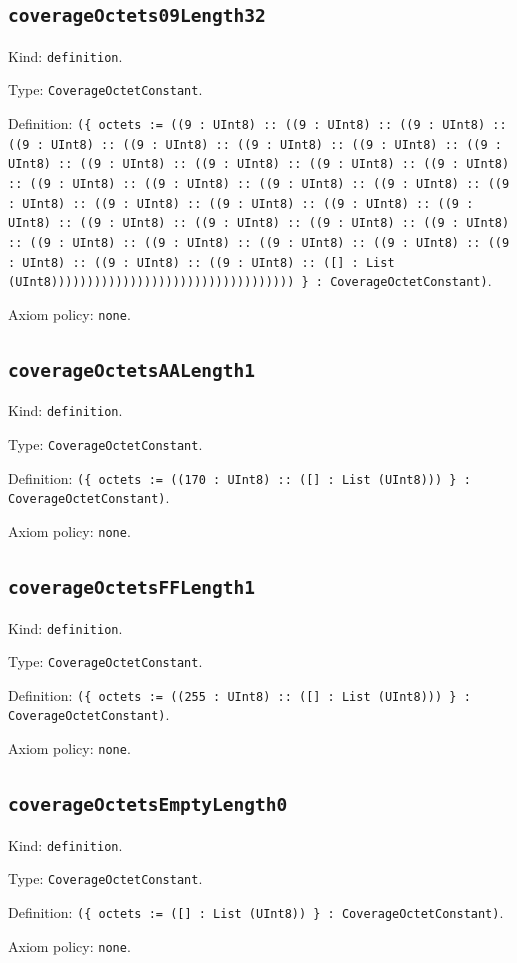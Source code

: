 \documentclass[11pt]{article}
\begin{document}
\subsection*{\texttt{coverageOctets09Length32}}
\noindent Kind: \texttt{definition}.\par
\noindent Type: \texttt{CoverageOctetConstant}.\par
\noindent Definition: \texttt{(\{ octets := ((9 : UInt8) :: ((9 : UInt8) :: ((9 : UInt8) :: ((9 : UInt8) :: ((9 : UInt8) :: ((9 : UInt8) :: ((9 : UInt8) :: ((9 : UInt8) :: ((9 : UInt8) :: ((9 : UInt8) :: ((9 : UInt8) :: ((9 : UInt8) :: ((9 : UInt8) :: ((9 : UInt8) :: ((9 : UInt8) :: ((9 : UInt8) :: ((9 : UInt8) :: ((9 : UInt8) :: ((9 : UInt8) :: ((9 : UInt8) :: ((9 : UInt8) :: ((9 : UInt8) :: ((9 : UInt8) :: ((9 : UInt8) :: ((9 : UInt8) :: ((9 : UInt8) :: ((9 : UInt8) :: ((9 : UInt8) :: ((9 : UInt8) :: ((9 : UInt8) :: ((9 : UInt8) :: ((9 : UInt8) :: ([] : List (UInt8)))))))))))))))))))))))))))))))))) \} : CoverageOctetConstant)}.\par
\noindent Axiom policy: \texttt{none}.\par
\subsection*{\texttt{coverageOctetsAALength1}}
\noindent Kind: \texttt{definition}.\par
\noindent Type: \texttt{CoverageOctetConstant}.\par
\noindent Definition: \texttt{(\{ octets := ((170 : UInt8) :: ([] : List (UInt8))) \} : CoverageOctetConstant)}.\par
\noindent Axiom policy: \texttt{none}.\par
\subsection*{\texttt{coverageOctetsFFLength1}}
\noindent Kind: \texttt{definition}.\par
\noindent Type: \texttt{CoverageOctetConstant}.\par
\noindent Definition: \texttt{(\{ octets := ((255 : UInt8) :: ([] : List (UInt8))) \} : CoverageOctetConstant)}.\par
\noindent Axiom policy: \texttt{none}.\par
\subsection*{\texttt{coverageOctetsEmptyLength0}}
\noindent Kind: \texttt{definition}.\par
\noindent Type: \texttt{CoverageOctetConstant}.\par
\noindent Definition: \texttt{(\{ octets := ([] : List (UInt8)) \} : CoverageOctetConstant)}.\par
\noindent Axiom policy: \texttt{none}.\par
\end{document}
